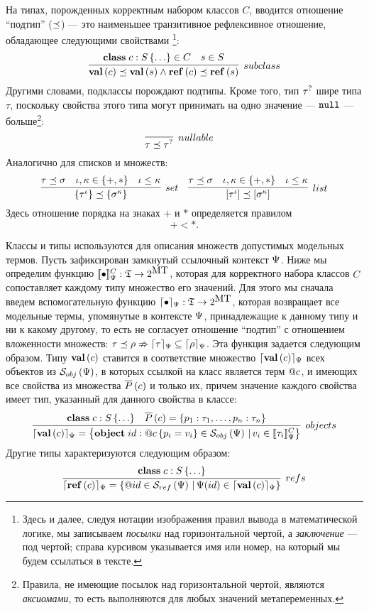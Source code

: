 На типах, порожденных корректным набором классов $C$, вводится отношение ``подтип'' ($\preceq$) --- это наименьшее транзитивное рефлексивное отношение, обладающее следующими свойствами%
\footnote{Здесь и далее, следуя нотации изображения правил вывода в математической логике, мы записываем \emph{посылки} над горизонтальной чертой, а \emph{заключение} --- под чертой; справа курсивом указывается имя или номер, на который мы будем ссылаться в тексте.}:
$$
\infer[subclass]{
\ClassT{c} \subtype \ClassT{s}
\wedge
\RefT{c} \subtype \RefT{s}
}{
	\Class{c}{S}{\ldots} \in C &
	s \in S}
$$  
Другими словами, подклассы порождают подтипы. Кроме того, тип ${\tau}^?$ шире типа $\tau$, поскольку свойства этого типа могут принимать на одно значение --- $\mathtt{null}$ --- больше\footnote{Правила, не имеющие посылок над горизонтальной чертой, являются \emph{аксиомами}, то есть выполняются для любых значений метапеременных.}:
$$
\infer[nullable]{
	\tau \subtype \NullableT{\tau}
}{}
\quad
$$
Аналогично для списков и множеств:
 $$
\infer[set]{
	\SetT{\tau^\iota} \subtype \SetT{\sigma^\kappa}
}{
	\tau \subtype \sigma &
	\iota, \kappa \in \{+, *\} &
	\iota \le \kappa
}
\quad
\infer[list]{
	\ListT{\tau^\iota} \subtype \ListT{\sigma^\kappa}
}{
	\tau \subtype \sigma &
	\iota, \kappa \in \{+, *\} &
	\iota \le \kappa
}
$$
Здесь отношение порядка на знаках $+$ и $*$ определяется правилом $$+ < *.$$

Классы и типы используются для описания множеств допустимых модельных термов.
Пусть зафиксирован замкнутый ссылочный контекст $\Psi$. 
Ниже мы определим функцию $[\![\bullet]\!]_\Psi^C : \mathfrak{T} \rightarrow 2^{\mbox{MT}}$, которая для корректного набора классов $C$ сопоставляет каждому типу множество его значений. Для этого мы сначала введем вспомогательную функцию $\lceil \bullet \rceil_\Psi : \mathfrak{T} \rightarrow 2^{\mbox{MT}}$, которая возвращает все модельные термы, упомянутые в контексте $\Psi$, принадлежащие к данному типу и ни к какому другому, то есть не согласует отношение ``подтип'' с отношением вложенности множеств: $\tau \preceq \rho \nRightarrow \lceil \tau \rceil_\Psi \subseteq \lceil \rho \rceil_\Psi$. Эта функция задается следующим образом. Типу $\mathbf{val}\left(c\right)$ ставится в соответствие множество $\lceil \mathbf{val}\left(c\right) \rceil_\Psi$ всех объектов из $\mathcal{S}_{obj}\left(\Psi\right)$, в которых ссылкой на класс является терм $@c$, и имеющих все свойства из множества $\overline{P}\left(c\right)$ и только их, причем значение каждого свойства имеет тип, указанный для данного свойства в классе:
$$
\infer[objects]{
	\semRC{\ClassT{c}} = \left\{
		\Object{id}{\Ref{c}}{p_i = v_i} \in \Objects{\RContext}
		\,|\,
		v_i \in \denotRCC{\tau_i} 
	\right\}
}{
	\Class{c}{S}{\ldots}&
	\AllProps{c} = \left\{p_1 : \tau_1, \ldots, p_n : \tau_n\right\}
}
$$ 
Другие типы характеризуются следующим образом:
$$
\infer[refs]{
	\semRC{\RefT{c}} = \left\{ \Ref{id} \in \Refs{\RContext} \,|\, \RContext(id) \in \semRC{\ClassT{c}} \right\}
}{
	\Class{c}{S}{\ldots}
}
$$

